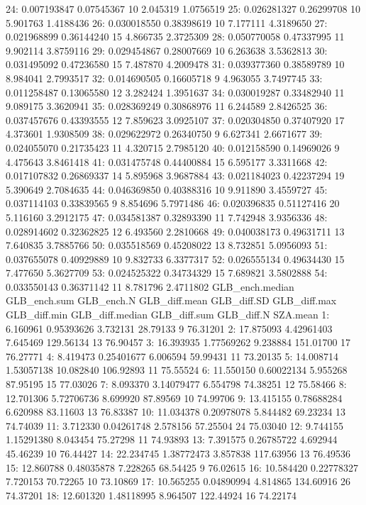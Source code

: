 \documentclass[
  10pt,
  a4paper,oneside]{article}
\begin{document}
24: 0.007193847 0.07545367 10 2.045319 1.0756519
25: 0.026281327 0.26299708 10 5.901763 1.4188436
26: 0.030018550 0.38398619 10 7.177111 4.3189650
27: 0.021968899 0.36144240 15 4.866735 2.3725309
28: 0.050770058 0.47337995 11 9.902114 3.8759116
29: 0.029454867 0.28007669 10 6.263638 3.5362813
30: 0.031495092 0.47236580 15 7.487870 4.2009478
31: 0.039377360 0.38589789 10 8.984041 2.7993517
32: 0.014690505 0.16605718 9 4.963055 3.7497745
33: 0.011258487 0.13065580 12 3.282424 1.3951637
34: 0.030019287 0.33482940 11 9.089175 3.3620941
35: 0.028369249 0.30868976 11 6.244589 2.8426525
36: 0.037457676 0.43393555 12 7.859623 3.0925107
37: 0.020304850 0.37407920 17 4.373601 1.9308509
38: 0.029622972 0.26340750 9 6.627341 2.6671677
39: 0.024055070 0.21735423 11 4.320715 2.7985120
40: 0.012158590 0.14969026 9 4.475643 3.8461418
41: 0.031475748 0.44400884 15 6.595177 3.3311668
42: 0.017107832 0.26869337 14 5.895968 3.9687884
43: 0.021184023 0.42237294 19 5.390649 2.7084635
44: 0.046369850 0.40388316 10 9.911890 3.4559727
45: 0.037114103 0.33839565 9 8.854696 5.7971486
46: 0.020396835 0.51127416 20 5.116160 3.2912175
47: 0.034581387 0.32893390 11 7.742948 3.9356336
48: 0.028914602 0.32362825 12 6.493560 2.2810668
49: 0.040038173 0.49631711 13 7.640835 3.7885766
50: 0.035518569 0.45208022 13 8.732851 5.0956093
51: 0.037655078 0.40929889 10 9.832733 6.3377317
52: 0.026555134 0.49634430 15 7.477650 5.3627709
53: 0.024525322 0.34734329 15 7.689821 3.5802888
54: 0.033550143 0.36371142 11 8.781796 2.4711802
GLB\_ench.median GLB\_ench.sum GLB\_ench.N GLB\_diff.mean GLB\_diff.SD
GLB\_diff.max GLB\_diff.min GLB\_diff.median GLB\_diff.sum GLB\_diff.N SZA.mean
1: 6.160961 0.95393626 3.732131 28.79133 9 76.31201
2: 17.875093 4.42961403 7.645469 129.56134 13 76.90457
3: 16.393935 1.77569262 9.238884 151.01700 17 76.27771
4: 8.419473 0.25401677 6.006594 59.99431 11 73.20135
5: 14.008714 1.53057138 10.082840 106.92893 11 75.55524
6: 11.550150 0.60022134 5.955268 87.95195 15 77.03026
7: 8.093370 3.14079477 6.554798 74.38251 12 75.58466
8: 12.701306 5.72706736 8.699920 87.89569 10 74.99706
9: 13.415155 0.78688284 6.620988 83.11603 13 76.83387
10: 11.034378 0.20978078 5.844482 69.23234 13 74.74039
11: 3.712330 0.04261748 2.578156 57.25504 24 75.03040
12: 9.744155 1.15291380 8.043454 75.27298 11 74.93893
13: 7.391575 0.26785722 4.692944 45.46239 10 76.44427
14: 22.234745 1.38772473 3.857838 117.63956 13 76.49536
15: 12.860788 0.48035878 7.228265 68.54425 9 76.02615
16: 10.584420 0.22778327 7.720153 70.72265 10 73.10869
17: 10.565255 0.04890994 4.814865 134.60916 26 74.37201
18: 12.601320 1.48118995 8.964507 122.44924 16 74.22174
\end{document}
